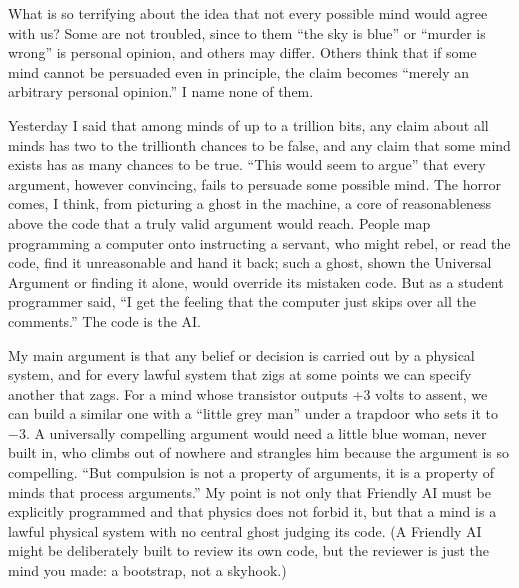 
What is so terrifying about the idea that not every possible mind would agree with us? Some are not troubled, since to them ``the sky is blue'' or ``murder is wrong'' is personal opinion, and others may differ. Others think that if some mind cannot be persuaded even in principle, the claim becomes ``merely an arbitrary personal opinion.'' I name none of them.

Yesterday I said that among minds of up to a trillion bits, any claim about all minds has two to the trillionth chances to be false, and any claim that some mind exists has as many chances to be true. ``This would seem to argue'' that every argument, however convincing, fails to persuade some possible mind. The horror comes, I think, from picturing a ghost in the machine, a core of reasonableness above the code that a truly valid argument would reach. People map programming a computer onto instructing a servant, who might rebel, or read the code, find it unreasonable and hand it back; such a ghost, shown the Universal Argument or finding it alone, would override its mistaken code. But as a student programmer said, ``I get the feeling that the computer just skips over all the comments.'' The code is the AI.

My main argument is that any belief or decision is carried out by a physical system, and for every lawful system that zigs at some points we can specify another that zags. For a mind whose transistor outputs +3 volts to assent, we can build a similar one with a ``little grey man'' under a trapdoor who sets it to $-3$. A universally compelling argument would need a little blue woman, never built in, who climbs out of nowhere and strangles him because the argument is so compelling. ``But compulsion is not a property of arguments, it is a property of minds that process arguments.'' My point is not only that Friendly AI must be explicitly programmed and that physics does not forbid it, but that a mind is a lawful physical system with no central ghost judging its code. (A Friendly AI might be deliberately built to review its own code, but the reviewer is just the mind you made: a bootstrap, not a skyhook.) 

